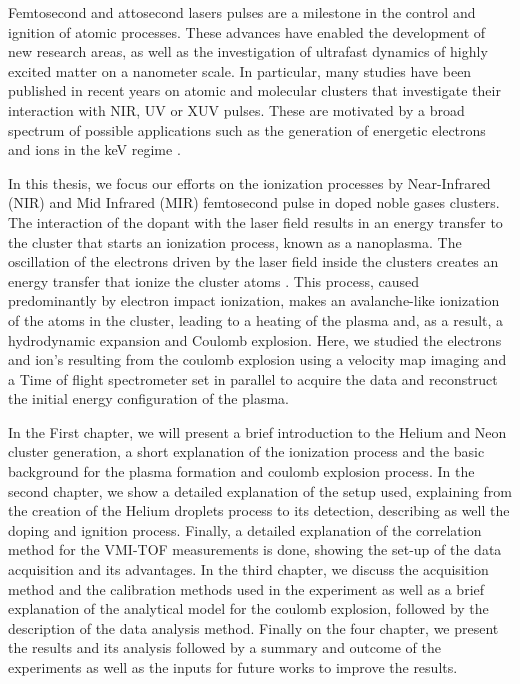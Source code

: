 Femtosecond and attosecond lasers pulses are a milestone in the control and ignition of atomic processes. These advances have enabled the development of new research areas, as well as the investigation of ultrafast dynamics of highly excited matter on a nanometer scale. In particular, many studies have been published in recent years on atomic and molecular clusters that investigate their interaction with NIR, UV or XUV pulses\cite{stebbings_generation_2011}. These are motivated by a broad spectrum of possible applications such as the generation of energetic electrons and ions in the keV regime \cite{fennel_laser-driven_2010}.

In this thesis, we focus our efforts on the ionization processes by Near-Infrared (NIR) and Mid Infrared (MIR) femtosecond pulse in doped noble gases clusters. The interaction of the dopant with the laser field results in an energy transfer to the cluster that starts an ionization process, known as a nanoplasma. The oscillation of the electrons driven by the laser field inside the clusters creates an energy transfer that ionize the cluster atoms \cite{fennel_laser-driven_2010}. This process, caused predominantly by electron impact ionization, makes an avalanche-like ionization of the atoms in the cluster, leading to a heating of the plasma and, as a result, a hydrodynamic expansion and Coulomb explosion. Here, we studied the electrons and ion's resulting from the coulomb explosion using a velocity map imaging and a Time of flight spectrometer set in parallel to acquire the data and reconstruct the initial energy  configuration of the plasma.


In the First chapter, we will present a brief introduction to the Helium and Neon cluster generation, a short explanation of the ionization process and the basic background for the plasma formation and coulomb explosion process. In the second chapter, we show a detailed explanation of the setup used, explaining from the creation of the Helium droplets process to its detection, describing as well the doping and ignition process. Finally, a detailed explanation of the correlation method for the VMI-TOF measurements is done, showing the set-up of the data acquisition and its advantages.  In the third chapter, we discuss the acquisition method and the calibration methods used in the experiment as well as a brief explanation of the analytical model for the coulomb explosion, followed by the description of the data analysis method. Finally on the four chapter, we present the results and its analysis followed by a summary and outcome of the experiments as well as the inputs for future works to improve the results.
